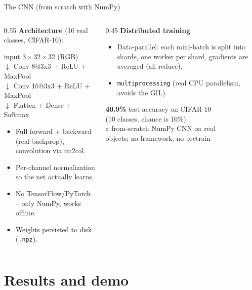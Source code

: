 \documentclass[aspectratio=169,11pt]{beamer}
\begin{document}
\begin{frame}{The CNN (from scratch with NumPy)}
\begin{columns}
\begin{column}{0.55\textwidth}
\textbf{Architecture} (10 real classes, CIFAR-10):
\begin{center}\scriptsize
input $3\times32\times32$ (RGB)\\
$\downarrow$ Conv 8@3x3 + ReLU + MaxPool\\
$\downarrow$ Conv 16@3x3 + ReLU + MaxPool\\
$\downarrow$ Flatten + Dense + Softmax
\end{center}
\begin{itemize}\scriptsize
  \item Full forward + backward (real backprop), convolution via im2col.
  \item Per-channel normalization so the net actually learns.
  \item No TensorFlow/PyTorch -- only NumPy, works offline.
  \item Weights persisted to disk (\texttt{.npz}).
\end{itemize}
\end{column}
\begin{column}{0.45\textwidth}
\textbf{Distributed training}
\begin{itemize}\scriptsize
  \item Data-parallel: each mini-batch is split into shards, one worker per shard,
  gradients are averaged (all-reduce).
  \item \texttt{multiprocessing} (real CPU parallelism, avoids the GIL).
\end{itemize}
\vspace{0.3em}
\begin{center}
\textbf{40.9\%} test accuracy on CIFAR-10\\
(10 classes, chance is 10\%)\\[2pt]
\scriptsize a from-scratch NumPy CNN on real\\
objects; no framework, no pretrain
\end{center}
\end{column}
\end{columns}
\end{frame}

\section{Results and demo}
\end{document}
